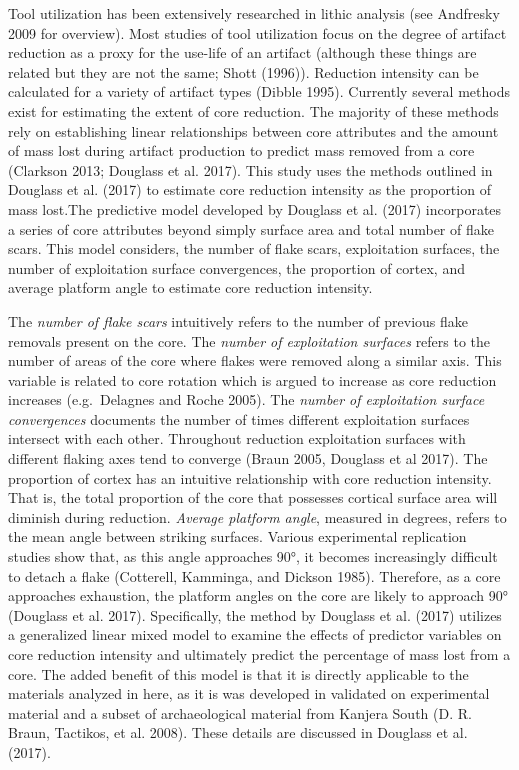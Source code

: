 \documentclass[]{elsarticle} %
\begin{document}
Tool utilization has been extensively researched in lithic analysis (see
Andfresky 2009 for overview). Most studies of tool utilization focus on
the degree of artifact reduction as a proxy for the use-life of an
artifact (although these things are related but they are not the same;
Shott (1996)). Reduction intensity can be calculated for a variety of
artifact types (Dibble 1995). Currently several methods exist for
estimating the extent of core reduction. The majority of these methods
rely on establishing linear relationships between core attributes and
the amount of mass lost during artifact production to predict mass
removed from a core (Clarkson 2013; Douglass et al. 2017). This study
uses the methods outlined in Douglass et al. (2017) to estimate core
reduction intensity as the proportion of mass lost.The predictive model
developed by Douglass et al. (2017) incorporates a series of core
attributes beyond simply surface area and total number of flake scars.
This model considers, the number of flake scars, exploitation surfaces,
the number of exploitation surface convergences, the proportion of
cortex, and average platform angle to estimate core reduction intensity.

The \emph{number of flake scars} intuitively refers to the number of
previous flake removals present on the core. The \emph{number of
exploitation surfaces} refers to the number of areas of the core where
flakes were removed along a similar axis. This variable is related to
core rotation which is argued to increase as core reduction increases
(e.g.~Delagnes and Roche 2005). The \emph{number of exploitation surface
convergences} documents the number of times different exploitation
surfaces intersect with each other. Throughout reduction exploitation
surfaces with different flaking axes tend to converge (Braun 2005,
Douglass et al 2017). The proportion of cortex has an intuitive
relationship with core reduction intensity. That is, the total
proportion of the core that possesses cortical surface area will
diminish during reduction. \emph{Average platform angle}, measured in
degrees, refers to the mean angle between striking surfaces. Various
experimental replication studies show that, as this angle approaches
90°, it becomes increasingly difficult to detach a flake (Cotterell,
Kamminga, and Dickson 1985). Therefore, as a core approaches exhaustion,
the platform angles on the core are likely to approach 90° (Douglass et
al. 2017). Specifically, the method by Douglass et al. (2017) utilizes a
generalized linear mixed model to examine the effects of predictor
variables on core reduction intensity and ultimately predict the
percentage of mass lost from a core. The added benefit of this model is
that it is directly applicable to the materials analyzed in here, as it
is was developed in validated on experimental material and a subset of
archaeological material from Kanjera South (D. R. Braun, Tactikos, et
al. 2008). These details are discussed in Douglass et al. (2017).
\end{document}
